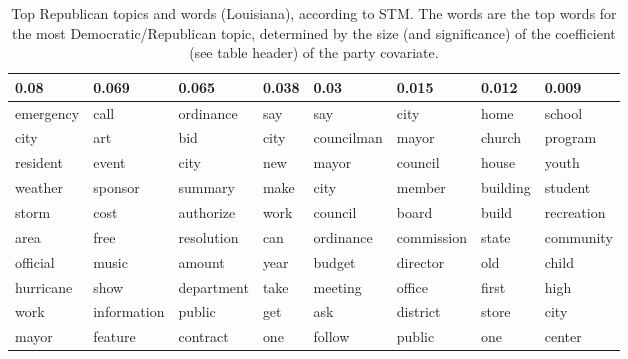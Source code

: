 \begin{table}[ht]
\centering
\begin{tabular}{llllllll}
  \hline
0.08 & 0.069 & 0.065 & 0.038 & 0.03 & 0.015 & 0.012 & 0.009 \\ 
  \hline
emergency & call & ordinance & say & say & city & home & school \\ 
  city & art & bid & city & councilman & mayor & church & program \\ 
  resident & event & city & new & mayor & council & house & youth \\ 
  weather & sponsor & summary & make & city & member & building & student \\ 
  storm & cost & authorize & work & council & board & build & recreation \\ 
  area & free & resolution & can & ordinance & commission & state & community \\ 
  official & music & amount & year & budget & director & old & child \\ 
  hurricane & show & department & take & meeting & office & first & high \\ 
  work & information & public & get & ask & district & store & city \\ 
  mayor & feature & contract & one & follow & public & one & center \\ 
   \hline
\end{tabular}
\caption{Top Republican topics and words (Louisiana), according to STM. 
The words are the top words for the most Democratic/Republican topic, determined
by the size (and significance) of the coefficient (see table header) of the party covariate.} 
\label{tabSTMLARep}
\end{table}

